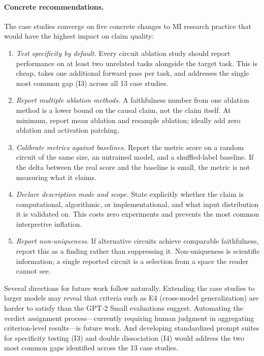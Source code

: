 \documentclass{article}
\begin{document}
\paragraph{Concrete recommendations.}
The case studies converge on five concrete changes to MI research practice that would have the highest impact on claim quality:
\begin{enumerate}[nosep]
\item \emph{Test specificity by default.} Every circuit ablation study should report performance on at least two unrelated tasks alongside the target task. This is cheap, takes one additional forward pass per task, and addresses the single most common gap (I3) across all 13 case studies.
\item \emph{Report multiple ablation methods.} A faithfulness number from one ablation method is a lower bound on the causal claim, not the claim itself. At minimum, report mean ablation and resample ablation; ideally add zero ablation and activation patching.
\item \emph{Calibrate metrics against baselines.} Report the metric score on a random circuit of the same size, an untrained model, and a shuffled-label baseline. If the delta between the real score and the baseline is small, the metric is not measuring what it claims.
\item \emph{Declare description mode and scope.} State explicitly whether the claim is computational, algorithmic, or implementational, and what input distribution it is validated on. This costs zero experiments and prevents the most common interpretive inflation.
\item \emph{Report non-uniqueness.} If alternative circuits achieve comparable faithfulness, report this as a finding rather than suppressing it. Non-uniqueness is scientific information; a single reported circuit is a selection from a space the reader cannot see.
\end{enumerate}

Several directions for future work follow naturally. Extending the case studies to larger models may reveal that criteria such as E4 (cross-model generalization) are harder to satisfy than the GPT-2 Small evaluations suggest. Automating the verdict assignment process---currently requiring human judgment in aggregating criterion-level results---is future work. And developing standardized prompt suites for specificity testing (I3) and double dissociation (I4) would address the two most common gaps identified across the 13 case studies.
\end{document}

